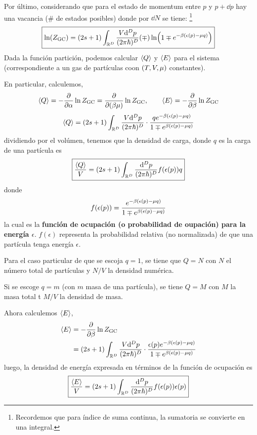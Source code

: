 Por último, considerando que para el estado de momentum entre $p$ y $p+\dd p$ hay una vacancia (\# de estados posibles) donde por $\dd N$ se tiene: \footnote{Recordemos que para índice de suma continua, la sumatoria se convierte en una integral.}
\begin{equation}
 \boxed{ \ln(Z_{\rm GC})=(2s+1)\int_{\mathbb{R}^D}\frac{V\dd^Dp}{(2\pi\hbar)^D}(\mp)\ln(1\mp e^{-\beta (\epsilon(p)-\mu q)})}
\end{equation}
Dada la función partición, podemos calcular $\ev{Q}$ y $\ev{E}$ para el sistema (correspondiente a un gas de partículas coon $(T,V,\mu )$ constantes).

En particular, calculemos,
\begin{equation}
  \ev{Q}=-\pdv{\a }\ln\zgc=\pdv{(\b\m )}\ln\zgc,\qquad \ev{E}=-\pdv{\b}\ln\zgc
\end{equation}
\begin{equation}
  \ev{Q}=(2s+1)\int_{\mathbb{R}^D}\frac{V\dd^Dp}{(2\p\hbar)^D}\cdot \frac{qe^{-\b (\epsilon(p)-\m q)}}{1\mp e^{\b (\epsilon(p)-\m q)}}
\end{equation}
dividiendo por el volúmen, tenemos que la densidad de carga, donde $q$ es la carga de una partícula es
\begin{equation}
 \boxed{ \frac{\ev{Q}}{V}=(2s+1)\int_{\mathbb{R}^D}\frac{\dd^Dp}{(2\p\hbar)^D}f(\epsilon(p))q}
\end{equation}
donde
\begin{equation}
  f(\epsilon(p))=\frac{e^{-\beta (\epsilon(p)-\mu q)}}{1\mp e^{\beta (\epsilon(p)-\mu q)}}
\end{equation}
la cual es la \textbf{función de ocupación (o probabilidad de oupación) para la energía $\epsilon$}. $f(\epsilon)$ representa la probabilidad relativa (no normalizada) de que una partícula tenga energía $\epsilon$.

Para el caso particular de que se escoja $q=1$, se tiene que $Q=N$ con $N$ el número total de partículas y $N/V$ la densidad numérica.

Si se escoge $q=m$ (con $m$ masa de una partícula), se tiene $Q=M$ con $M$ la masa total t $M/V$ la densidad de masa.

Ahora calculemos $\ev{E}$,
\begin{align}
  \ev{E}&=-\pdv{\b}\ln\zgc\\
  &=(2s+1)\int_{\mathbb{R}^D}\frac{V\dd^Dp}{(2\p\hbar)^D}\cdot \frac{\epsilon(p)e^{-\b (\epsilon(p)-\m q)}}{1\mp e^{\b (\epsilon(p)-\m q)}}
\end{align}
luego, la densidad de energía expresada en términos de la función de ocupación es
\begin{equation}
  \boxed{\frac{\ev{E}}{V}=(2s+1)\int_{\mathbb{R}^D}\frac{\dd^Dp}{(2\p\hbar)^D}f(\epsilon(p))\epsilon(p)}
\end{equation}

